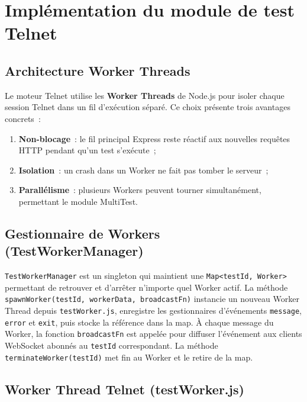 \section{Implémentation du module de test Telnet}

\subsection{Architecture Worker Threads}

Le moteur Telnet utilise les \textbf{Worker Threads} de Node.js pour
isoler chaque session Telnet dans un fil d'exécution séparé. Ce choix
présente trois avantages concrets~:

\begin{enumerate}
  \item \textbf{Non-blocage}~: le fil principal Express reste réactif
        aux nouvelles requêtes HTTP pendant qu'un test s'exécute~;
  \item \textbf{Isolation}~: un crash dans un Worker ne fait pas tomber
        le serveur~;
  \item \textbf{Parallélisme}~: plusieurs Workers peuvent tourner
        simultanément, permettant le module MultiTest.
\end{enumerate}

\subsection{Gestionnaire de Workers (TestWorkerManager)}

\texttt{TestWorkerManager} est un singleton qui maintient une
\texttt{Map<testId,~Worker>} permettant de retrouver et d'arrêter n'importe quel
Worker actif. La méthode \texttt{spawnWorker(testId, workerData, broadcastFn)}
instancie un nouveau Worker Thread depuis \texttt{testWorker.js}, enregistre les
gestionnaires d'événements \texttt{message}, \texttt{error} et \texttt{exit}, puis
stocke la référence dans la map. À chaque message du Worker, la fonction
\texttt{broadcastFn} est appelée pour diffuser l'événement aux clients WebSocket
abonnés au \texttt{testId} correspondant. La méthode \texttt{terminateWorker(testId)}
met fin au Worker et le retire de la map.

\subsection{Worker Thread Telnet (testWorker.js)}

